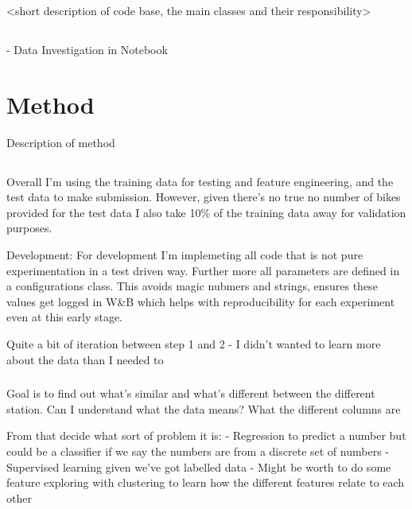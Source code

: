 \documentclass{article}
\begin{document}
    <short description of code base, the main classes and their responsibility>

    \subsection*{}

    \subsubsection*{}
    - Data Investigation in Notebook


    \section{Method}\label{sec:method}

    Description of method\\

    \subsection*{}

    Overall I'm using the training data for testing and feature engineering, and the test data to make submission.
    However, given there's no true no number of bikes provided for the test data I also take 10\% of the training data away
    for validation purposes.

    Development:
    For development I'm implemeting all code that is not pure experimentation in a test driven way. Further more all parameters are defined in a configurations class. This avoids magic nubmers and
    strings, ensures these values get logged in W&B which helps with reproducibility for each experiment even at this early stage.

    Quite a bit of iteration between step 1 and 2 - I didn't wanted to learn more about the data than I needed to

    \subsubsection*{}
    Goal is to find out what's similar and what's different between the different station.
    Can I understand what the data means? What the different columns are

    From that decide what sort of problem it is:
    - Regression to predict a number but could be a classifier if we say the numbers are from a discrete set of numbers
    - Supervised learning given we've got labelled data
    - Might be worth to do some feature exploring with clustering to learn how the different features relate to each other
\end{document}
